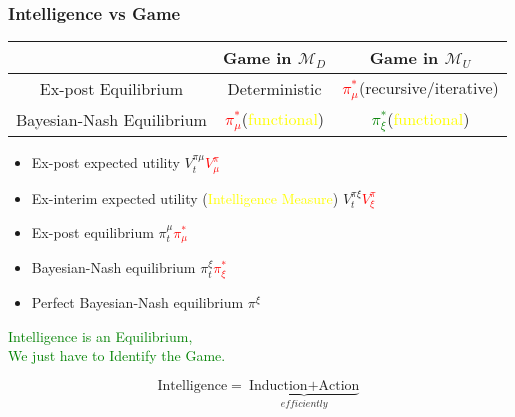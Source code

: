 \documentclass[UTF8,11pt,colorlinks,compress,openany]{beamer}%
\begin{document}
\begin{frame}\frametitle{Intelligence vs Game}
\begin{minipage}{70ex}
\begin{table}[H]
\abovetabulinesep=1mm
\belowtabulinesep=1mm
\begin{tabu}{c|c|c}
					\hline
						&Game in $\mathcal{M}_D$ &Game in $\mathcal{M}_U$\\
						\hline
						Ex-post Equilibrium &Deterministic &\textcolor{red}{$\pi_\mu^*$}(recursive/iterative)\\
						\hline
						Bayesian-Nash Equilibrium & \textcolor{red}{$\pi_\mu^*$}(\textcolor{yellow}{functional}) &\textcolor{green}{$\pi_\xi^*$}(\textcolor{yellow}{functional})\\
					\hline
\end{tabu}
\end{table}
\end{minipage}
	\begin{center}
		\begin{minipage}{.87\textwidth}
			\begin{itemize}
				\item Ex-post expected utility $V_t^{\pi\mu}$\hfill \textcolor{red}{$V_\mu^\pi$}
				\item Ex-interim expected utility (\textcolor{yellow}{Intelligence Measure}) $V_t^{\pi\xi}$\hfill \textcolor{red}{$V_\xi^\pi$}
				\item Ex-post equilibrium $\pi_t^\mu$\hfill \textcolor{red}{$\pi_\mu^*$}
				\item Bayesian-Nash equilibrium $\pi_t^\xi$\hfill \textcolor{red}{$\pi_\xi^*$}
				\item Perfect Bayesian-Nash equilibrium $\pi^\xi$
			\end{itemize}
		\end{minipage}
	\end{center}
	\begin{center}
		\textcolor{green}{\Large Intelligence is an Equilibrium,\\
			We just have to Identify the Game.}
	\end{center}
	\[\text{Intelligence}=\underbrace{\text{Induction}+\text{Action}}_{\textit{efficiently}}\]
\end{frame}
\end{document}
